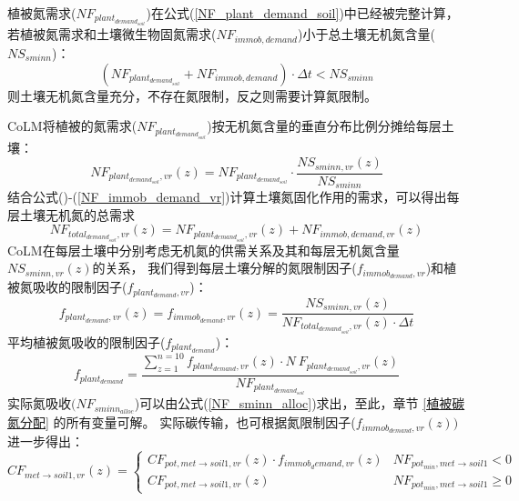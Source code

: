 植被氮需求($NF_{plant_{demand_{soil}}}$)在公式(\ref{NF_plant_demand_soil})中已经被完整计算，若植被氮需求和土壤微生物固氮需求($NF_{immob,demand}$)小于总土壤无机氮含量(${NS}_{sminn}$)：
\begin{equation}
    \left(NF_{plant_{demand_{soil}}}+NF_{immob,demand}\right)\cdot\Delta t<NS_{sminn}
\end{equation}
则土壤无机氮含量充分，不存在氮限制，反之则需要计算氮限制。

CoLM将植被的氮需求($NF_{plant_{demand_{soil}}}$)按无机氮含量的垂直分布比例分摊给每层土壤：
\begin{equation}
    NF_{plant_{demand_{soil}},vr}\left(z\right)=NF_{plant_{demand_{soil}}}\cdot\frac{NS_{sminn,vr}\left(z\right)}{NS_{sminn}}
\end{equation}
结合公式(\label{NF_pot_minmet})-(\ref{NF_immob_demand_vr})计算土壤氮固化作用的需求，可以得出每层土壤无机氮的总需求
\begin{equation}
    NF_{total_{demand_{soil}},vr}\left(z\right)=NF_{plant_{demand_{soil}},vr}\left(z\right)+NF_{immob,demand,vr}\left(z\right)
\end{equation}
CoLM在每层土壤中分别考虑无机氮的供需关系及其和每层无机氮含量${NS}_{sminn,vr}\left(z\right)$的关系，
我们得到每层土壤分解的氮限制因子($f_{immob_{demand},vr}$)和植被氮吸收的限制因子($f_{plant_{demand},vr}$)：
\begin{equation}
    f_{plant_{demand},vr}\left(z\right)=f_{immob_{demand},vr}\left(z\right)=\frac{NS_{sminn,vr}\left(z\right)}{NF_{total_{demand_{soil}},vr}\left(z\right)\cdot\Delta t}
\end{equation}
平均植被氮吸收的限制因子($f_{plant_{demand}}$)：
\begin{equation}
    f_{plant_{demand}}=\frac{\sum_{z=1}^{n=10}{f_{plant_{demand},vr}\left(z\right)\cdot N\ F_{plant_{demand_{soil}},vr}\left(z\right)}}{NF_{plant_{demand_{soil}}}}
\end{equation}
实际氮吸收$(NF_{sminn_{alloc}}$)可以由公式(\ref{NF_sminn_alloc})求出，至此，章节 \ref{植被碳氮分配} 的所有变量可解。
实际碳传输，也可根据氮限制因子($f_{immob_{demand},vr}\left(z\right))$进一步得出：
\begin{equation}
C F_{met \rightarrow { soil1,vr }}(z)=\left\{\begin{array}{ll}C F_{pot, met \rightarrow soil1, vr}(z) \cdot f_{{immob }_{d} { emand }, vr}(z) & N F_{pot_{m in }, { met } \rightarrow { soil } 1}<0 \\ C F_{pot, met \rightarrow { soil1,vr }}(z) & N F_{pot_{m in }, { met } \rightarrow { soil } 1} \geq 0\end{array}\right.
\end{equation}
